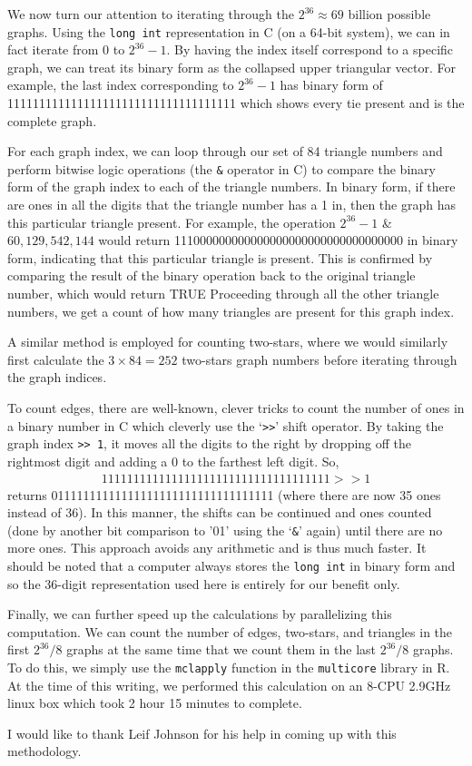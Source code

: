 We now turn our attention to iterating through the $2^{36} \approx 69$ billion possible graphs.  
Using the \texttt{long int} representation in C (on a 64-bit system), 
we can in fact iterate from 0 to $2^{36}-1$.  By having the index itself 
correspond to a specific graph,  we can treat its binary form as 
the collapsed upper triangular vector.
For example, the last index corresponding to $2^{36}-1$ has binary form of 
 111111111111111111111111111111111111 which shows every tie present and
 is the complete graph.
   
For each graph index, we can loop through our set of 84 triangle numbers
and perform bitwise logic operations (the \texttt{\&} operator in C) to 
compare the binary form of the graph index to each of the triangle numbers.  
In binary form, if there are ones in all the digits that the triangle number has a 1 in, 
then the graph has this particular triangle present.
For example, the operation $2^{36}-1$ \& $60,129,542,144$ would return 
111000000000000000000000000000000000 in binary form, indicating that this 
particular triangle is present.  This is confirmed by comparing the
result of the binary operation back to the original triangle number,
which would return TRUE  Proceeding through all the other triangle numbers, 
we get a count of how many triangles are present for this graph index.

A similar method is employed for counting two-stars, where we would similarly
first calculate the $3\times84 = 252$ two-stars graph numbers before iterating
through the graph indices.

To count edges, there are well-known, clever tricks to count the number of ones 
in a binary number in C which cleverly use the `\texttt{>>}' shift operator.
By taking the graph index \texttt{>> 1}, it moves all the digits to the 
right by dropping off the rightmost digit and adding a 0 to the 
farthest left digit.  So, 
\begin{align*}
111111111111111111111111111111111111 >> 1
\end{align*}
returns 01111111111111111111111111111111111 (where there are now 35 ones instead of 36).  
In this manner, the shifts can be continued and ones counted 
(done by another bit comparison to '01' using the `\texttt{\&}' again) 
until there are no more ones.  This approach avoids any arithmetic and is thus much faster.  
It should be noted that a computer always stores the \texttt{long int} in binary form 
and so the 36-digit representation used here is entirely for our benefit only.

Finally, we can further speed up the calculations by parallelizing this computation.  
We can count the number of edges, two-stars, and triangles in the 
first $2^{36}/8$ graphs at the same time that we count them in the last $2^{36}/8$ graphs.  
To do this, we simply use the \texttt{mclapply} function in the \texttt{multicore} \citep{multicore:R} 
library in R.
At the time of this writing, we performed this calculation on an 8-CPU 2.9GHz linux box
which took 2 hour 15 minutes to complete.  

I would like to thank Leif Johnson for his help in coming up with this methodology.



